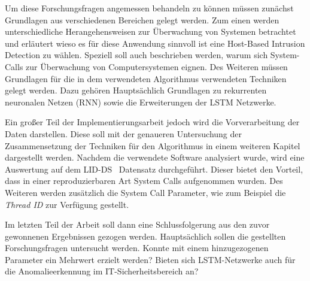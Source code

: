 Um diese Forschungsfragen angemessen behandeln zu können müssen zunächst Grundlagen aus verschiedenen Bereichen gelegt werden.
Zum einen werden unterschiedliche Herangehensweisen zur Überwachung von Systemen betrachtet und erläutert wieso es für diese Anwendung sinnvoll ist eine Host-Based Intrusion Detection zu wählen.
Speziell soll auch beschrieben werden, warum sich System-Calls zur Überwachung von Computersystemen eignen.
Des Weiteren müssen Grundlagen für die in dem verwendeten Algorithmus verwendeten Techniken gelegt werden.
Dazu gehören Hauptsächlich Grundlagen zu rekurrenten neuronalen Netzen (RNN) sowie die Erweiterungen der LSTM Netzwerke.

Ein großer Teil der Implementierungsarbeit jedoch wird die Vorverarbeitung der Daten darstellen.
Diese soll mit der genaueren Untersuchung der Zusammensetzung der Techniken für den Algorithmus in einem weiteren Kapitel dargestellt werden.
Nachdem die verwendete Software analysiert wurde, wird eine Auswertung auf dem LID-DS~\cite{LID-DS} Datensatz durchgeführt.
Dieser bietet den Vorteil, dass in einer reproduzierbaren Art System Calls aufgenommen wurden.
Des Weiteren werden zusätzlich die System Call Parameter, wie zum Beispiel die \textit{Thread ID} zur Verfügung gestellt.

Im letzten Teil der Arbeit soll dann eine Schlussfolgerung aus den zuvor gewonnenen Ergebnissen gezogen werden. 
Hauptsächlich sollen die gestellten Forschungsfragen untersucht werden.
Konnte mit einem hinzugezogenen Parameter ein Mehrwert erzielt werden?
Bieten sich LSTM-Netzwerke auch für die Anomalieerkennung im IT-Sicherheitsbereich an?
